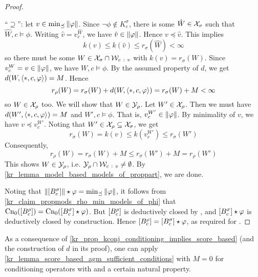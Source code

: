 \begin{proof}
\begin{claimproof}
            ``$\supseteq$'': let $v \in \min_{\preceq}{\|{\varphi}\|}$. Since
            $\neg\phi \notin K^\sigma_c$, there is some $\hat{W} \in \mathcal{X}_\sigma$
            such that $\hat{W}, c \models \phi$. Writing $\hat{v} =
            v^{\hat{W}}_c$, we have $\hat{v} \in \|{\varphi}\|$. Hence $v
            \preceq \hat{v}$. This implies
            \[
                k(v) \le k(\hat{v}) \le r_\sigma(\hat{W}) < \infty
            \]
            so there must be some $W \in \mathcal{X}_\sigma \cap \mathcal{W}_{c\ :\  v}$ with
            $k(v) = r_\sigma(W)$. Since $v^W_c = v \in \|{\varphi}\|$, we
            have $W, c \models \phi$. By the assumed property of $d$, we get
            $d(W, \langle {\ast, c, \varphi} \rangle) = M$. Hence
            \[
                r_\rho(W)
                = r_\sigma(W) + d(W, \langle {\ast, c, \varphi} \rangle)
                = r_\sigma(W) + M
                < \infty
            \]
            so $W \in \mathcal{X}_\rho$ too. We will show that $W \in \mathcal{Y}_\rho$. Let $W'
            \in \mathcal{X}_\rho$. Then we must have $d(W', \langle {\ast, c, \varphi} \rangle) = M$
            and $W', c \models \phi$. That is, $v^{W'}_c \in \|{\varphi}\|$.
            By minimality of $v$, we have $v \preceq v^{W'}_c$. Noting that $W'
            \in \mathcal{X}_\rho \subseteq \mathcal{X}_\sigma$, we get
            \[
                r_\sigma(W)
                = k(v)
                \le k(v^{W'}_c)
                \le r_\sigma(W')
            \]
            Consequently,
            \[
                r_\rho(W)
                = r_\sigma(W) + M
                \le r_\sigma(W') + M
                = r_\rho(W')
            \]
            This shows $W \in \mathcal{Y}_\rho$, i.e. $\mathcal{Y}_\rho \cap \mathcal{W}_{c\ :\  v} \ne
            \emptyset$. By \cref{kr_lemma_model_based_models_of_proppart}, we are
            done.
        \end{claimproof}

    Noting that $\|{\left[{B^\sigma_c}\right]}\| \star \varphi =
    \min_{\preceq}{\|{\varphi}\|}$, it follows from
    \cref{kr_claim_propmods_rho_min_models_of_phi} that
    $\operatorname{Cn}_0(\left[{B^\rho_c}\right]) = \operatorname{Cn}_0(\left[{B^\sigma_c}\right] \star \varphi)$.
    But $\left[{B^\rho_c}\right]$ is deductively closed by \closure{}, and
    $\left[{B^\sigma_c}\right]
    \star \varphi$ is deductively closed by construction. Hence
    $\left[{B^\rho_c}\right] = \left[{B^\sigma_c}\right] \star \varphi$, as required for
    \agm{}.
\end{proof}

As a consequence of \cref{kr_prop_kconj_conditioning_implies_score_based} (and the
construction of $d$ in its proof), one can apply
\cref{kr_lemma_score_based_agm_sufficient_conditions} with $M = 0$ for
conditioning operators with \kconj{} and a certain natural property.

